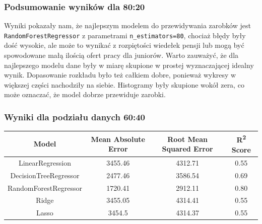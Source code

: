 \documentclass[a4paper]{article}
\begin{document}
\subsubsection{Podsumowanie wyników dla 80:20}

\quad Wyniki pokazały nam, że najlepszym modelem do przewidywania zarobków jest \texttt{RandomForestRegressor} z parametrami \texttt{n\_estimators=80},
chociaż błędy były dość wysokie, ale może to wynikać z rozpiętości wiedełek pensji lub mogą być spowodowane małą ilością ofert pracy dla juniorów. Warto zauważyć, że
dla najlepszego modelu dane były w miarę skupione w prostej wyznaczającej idealny wynik. Dopasowanie rozkładu było też całkiem dobre, ponieważ
wykresy w większej części nachodziły na siebie. Histogramy były skupione wokół zera, co może oznaczać, że model dobrze przewiduje zarobki.


\subsubsection{Wyniki dla podziału danych 60:40}

\begin{table}[H]
    \centering
    \begin{tabular}{|c|c|c|c|}
        \hline
        \textbf{Model}        & \textbf{Mean Absolute Error} & \textbf{Root Mean Squared Error} & \textbf{R\textsuperscript{2} Score} \\ \hline
        LinearRegression      & 3455.46                      & 4312.71                          & 0.55                                \\ \hline
        DecisionTreeRegressor & 2477.46                      & 3586.54                          & 0.69                                \\ \hline
        RandomForestRegressor & 1720.41                      & 2912.11                          & 0.80                                \\ \hline
        Ridge                 & 3455.05                      & 4314.41                          & 0.55                                \\ \hline
        Lasso                 & 3454.5                       & 4314.37                          & 0.55                                \\ \hline
    \end{tabular}
\end{table}
\end{document}
